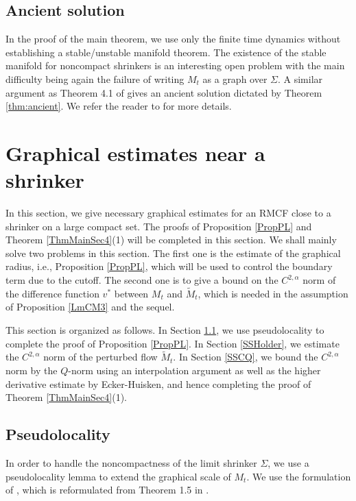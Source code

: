 \documentclass[12pt]{amsart}
\numberwithin{equation}{section}
\numberwithin{equation}{section}
\newcommand{\al}{\alpha}
\begin{document}
	\subsection{Ancient solution}\label{SSAncient}
	In the proof of the main theorem, we use only the finite time dynamics without establishing a stable/unstable manifold theorem. The existence of the stable manifold for noncompact shrinkers is an interesting open problem with the main difficulty being again the failure of writing $M_t$ as a graph over $\Sigma$. A similar argument as Theorem 4.1 of \cite{SX} gives an ancient solution dictated by Theorem \ref{thm:ancient}. We refer the reader to \cite{SX} for more details. 
	
	
	\section{Graphical estimates near a shrinker}\label{SEstimate}
	In this section, we give necessary graphical estimates for an RMCF close to a shrinker on a large compact set. The proofs of Proposition \ref{PropPL} and Theorem \ref{ThmMainSec4}(1) will be completed in this section. We shall mainly solve two problems in this section. The first one is the estimate of the graphical radius, i.e., Proposition \ref{PropPL}, which will be used to control the boundary term due to the cutoff. The second one is to give a bound on the $C^{2,\al}$ norm of the difference function $v^*$ between $M_t$ and $\widetilde M_t$, which is needed in the assumption of Proposition \ref{LmCM3} and the sequel. 
	
	This section is organized as follows. In Section \ref{SSPL}, we use pseudolocality to complete the proof of Proposition \ref{PropPL}. In Section \ref{SSHolder}, we estimate the $C^{2,\al}$ norm of the perturbed flow $\widetilde{M}_t$. In Section \ref{SSCQ}, we bound the  $C^{2,\al}$ norm by the $Q$-norm using an interpolation argument as well as the higher derivative estimate by Ecker-Huisken, and hence completing the proof of Theorem \ref{ThmMainSec4}(1). 
	
	\subsection{Pseudolocality}\label{SSPL}
	In order to handle the noncompactness of the limit shrinker $\Sigma$, we use a pseudolocality lemma to extend the graphical scale of $M_t$. We use the formulation of \cite[Proposition 5.1]{CS}, which is reformulated from Theorem 1.5 in \cite{INS}. 
	
\end{document}
